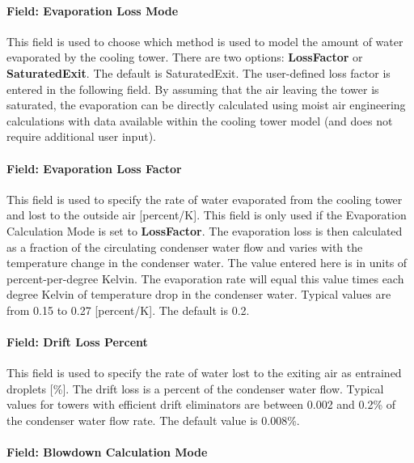 \paragraph{Field: Evaporation Loss Mode}\label{field-evaporation-loss-mode}

This field is used to choose which method is used to model the amount of water evaporated by the cooling tower. There are two options: \textbf{LossFactor} or \textbf{SaturatedExit}. The default is SaturatedExit. The user-defined loss factor is entered in the following field. By assuming that the air leaving the tower is saturated, the evaporation can be directly calculated using moist air engineering calculations with data available within the cooling tower model (and does not require additional user input).

\paragraph{Field: Evaporation Loss Factor}\label{field-evaporation-loss-factor}

This field is used to specify the rate of water evaporated from the cooling tower and lost to the outside air {[}percent/K{]}. This field is only used if the Evaporation Calculation Mode is set to \textbf{LossFactor}. The evaporation loss is then calculated as a fraction of the circulating condenser water flow and varies with the temperature change in the condenser water. The value entered here is in units of percent-per-degree Kelvin. The evaporation rate will equal this value times each degree Kelvin of temperature drop in the condenser water. Typical values are from 0.15 to 0.27 {[}percent/K{]}. The default is 0.2.

\paragraph{Field: Drift Loss Percent}\label{field-drift-loss-percent}

This field is used to specify the rate of water lost to the exiting air as entrained droplets {[}\%{]}. The drift loss is a percent of the condenser water flow. Typical values for towers with efficient drift eliminators are between 0.002 and 0.2\% of the condenser water flow rate. The default value is 0.008\%.

\paragraph{Field: Blowdown Calculation Mode}\label{field-blowdown-calculation-mode}

